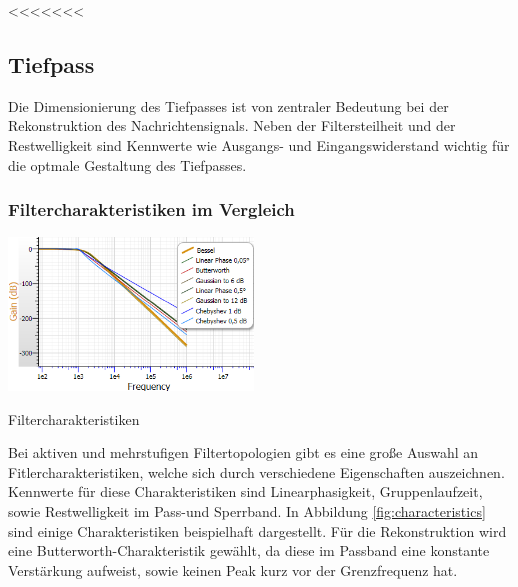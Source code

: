 <<<<<<<
\newpage
\subsection{Tiefpass}
Die Dimensionierung des Tiefpasses ist von zentraler Bedeutung bei der Rekonstruktion des Nachrichtensignals. Neben der Filtersteilheit und der Restwelligkeit sind Kennwerte wie Ausgangs- und Eingangswiderstand wichtig für die optmale Gestaltung des Tiefpasses.
\subsubsection{Filtercharakteristiken im Vergleich} 
\begin{floatingfigure}[r]{7cm}
	\includegraphics[width=6.5cm]{gfx/simRx/characteristics.png}
	\caption{Filtercharakteristiken}
\label{fig:characteristics}
\end{floatingfigure}
\noindent
Bei aktiven und mehrstufigen Filtertopologien gibt es eine große Auswahl an Fitlercharakteristiken, welche sich durch verschiedene Eigenschaften auszeichnen. Kennwerte für diese Charakteristiken sind Linearphasigkeit, Gruppenlaufzeit, sowie Restwelligkeit im Pass-und Sperrband. In Abbildung \ref{fig:characteristics} sind einige Charakteristiken beispielhaft dargestellt. Für die Rekonstruktion wird eine Butterworth-Charakteristik gewählt, da diese im Passband eine konstante Verstärkung aufweist, sowie keinen Peak kurz vor der Grenzfrequenz hat.\\

